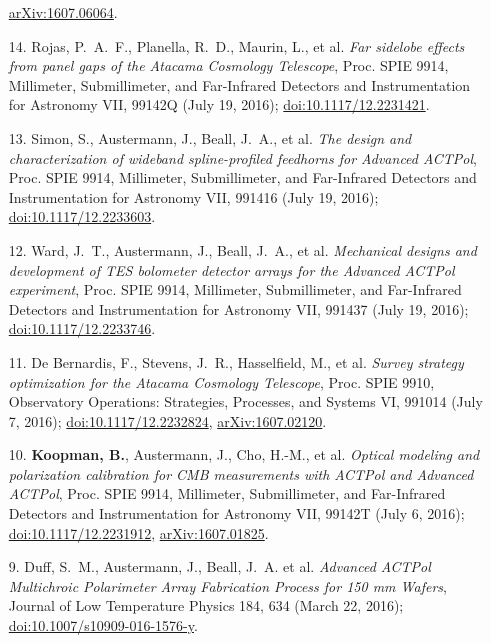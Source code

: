 \documentclass[margin,line]{res}
\begin{document}
\begin{resume}
\begin{enumerate}
    \href{http://arxiv.org/abs/1607.06064}{arXiv:1607.06064}.
\item[{14.}] Rojas, P.~A.~F., Planella, R.~D., Maurin, L., et al. \textit{Far
    sidelobe effects from panel gaps of the Atacama Cosmology Telescope}, Proc.
    SPIE 9914, Millimeter, Submillimeter, and Far-Infrared Detectors and
    Instrumentation for Astronomy VII, 99142Q (July 19, 2016);
    \href{http://dx.doi.org/10.1117/12.2231421}{doi:10.1117/12.2231421}.
\item[{13.}] Simon, S., Austermann, J., Beall, J.~A., et al. \textit{The design
    and characterization of wideband spline-profiled feedhorns for Advanced
    ACTPol}, Proc. SPIE 9914, Millimeter, Submillimeter, and Far-Infrared Detectors
    and Instrumentation for Astronomy VII, 991416 (July 19, 2016);
    \href{http://dx.doi.org/10.1117/12.2233603}{doi:10.1117/12.2233603}.
\item[{12.}] Ward, J.~T., Austermann, J., Beall, J.~A., et al.
    \textit{Mechanical designs and development of TES bolometer detector arrays for
    the Advanced ACTPol experiment}, Proc. SPIE 9914, Millimeter, Submillimeter,
    and Far-Infrared Detectors and Instrumentation for Astronomy VII, 991437 (July
    19, 2016); \href{http://dx.doi.org/10.1117/12.2233746}{doi:10.1117/12.2233746}.
\item[{11.}] De Bernardis, F., Stevens, J.~R., Hasselfield, M., et al.
    \textit{Survey strategy optimization for the Atacama Cosmology Telescope},
    Proc. SPIE 9910, Observatory Operations: Strategies, Processes, and Systems
    VI, 991014 (July 7, 2016);
    \href{http://dx.doi.org/10.1117/12.2232824}{doi:10.1117/12.2232824},
    \href{https://arxiv.org/abs/1607.02120}{arXiv:1607.02120}.
\item[{10.}] \textbf{Koopman, B.}, Austermann, J., Cho, H.-M., et al. \textit{Optical
    modeling and polarization calibration for CMB measurements with ACTPol and
    Advanced ACTPol}, Proc. SPIE 9914, Millimeter, Submillimeter, and Far-Infrared
    Detectors and Instrumentation for Astronomy VII, 99142T (July 6, 2016);
    \href{http://dx.doi.org/10.1117/12.2231912}{doi:10.1117/12.2231912},
    \href{https://arxiv.org/abs/1607.01825}{arXiv:1607.01825}.
\item[{9.}] Duff, S.~M., Austermann, J., Beall, J.~A. et al. \textit{Advanced
    ACTPol Multichroic Polarimeter Array Fabrication Process for 150 mm Wafers},
    Journal of Low Temperature Physics 184, 634 (March 22, 2016);
    \href{http://dx.doi.org/10.1007/s10909-016-1576-y}{doi:10.1007/s10909-016-1576-y}.

\end{enumerate}
\end{resume}
\end{document}
